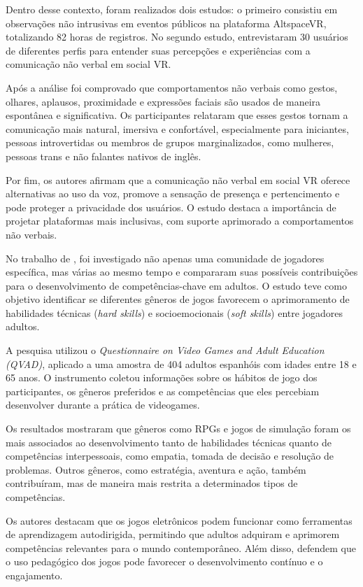 Dentro desse contexto, foram realizados dois estudos: o primeiro consistiu em observações não intrusivas em eventos públicos na plataforma AltspaceVR, totalizando 82 horas de registros.
No segundo estudo, entrevistaram 30 usuários de diferentes perfis para entender suas percepções e experiências com a comunicação não verbal em social VR.

Após a análise foi comprovado que comportamentos não verbais como gestos, olhares, aplausos, proximidade e expressões faciais são usados de maneira espontânea e significativa.
Os participantes relataram que esses gestos tornam a comunicação mais natural, imersiva e confortável, especialmente para iniciantes, pessoas introvertidas ou membros de grupos marginalizados, como mulheres, pessoas trans e não falantes nativos de inglês.

Por fim, os autores afirmam que a comunicação não verbal em social VR oferece alternativas ao uso da voz, promove a sensação de presença e pertencimento e pode proteger a privacidade dos usuários.
O estudo destaca a importância de projetar plataformas mais inclusivas, com suporte aprimorado a comportamentos não verbais.


No trabalho de , foi investigado não apenas uma comunidade de jogadores específica, mas várias ao mesmo tempo e compararam suas possíveis contribuições para o desenvolvimento de competências-chave em adultos. O estudo teve como objetivo identificar se diferentes gêneros de jogos favorecem o aprimoramento de habilidades técnicas (\textit{hard skills}) e socioemocionais (\textit{soft skills}) entre jogadores adultos.

A pesquisa utilizou o \textit{Questionnaire on Video Games and Adult Education (QVAD)}, aplicado a uma amostra de 404 adultos espanhóis com idades entre 18 e 65 anos. O instrumento coletou informações sobre os hábitos de jogo dos participantes, os gêneros preferidos e as competências que eles percebiam desenvolver durante a prática de videogames.

Os resultados mostraram que gêneros como RPGs e jogos de simulação foram os mais associados ao desenvolvimento tanto de habilidades técnicas quanto de competências interpessoais, como empatia, tomada de decisão e resolução de problemas. Outros gêneros, como estratégia, aventura e ação, também contribuíram, mas de maneira mais restrita a determinados tipos de competências.

Os autores destacam que os jogos eletrônicos podem funcionar como ferramentas de aprendizagem autodirigida, permitindo que adultos adquiram e aprimorem competências relevantes para o mundo contemporâneo. Além disso, defendem que o uso pedagógico dos jogos pode favorecer o desenvolvimento contínuo e o engajamento.

